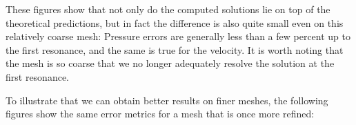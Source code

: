 \documentclass{article}
\begin{document}
These figures show that not only do the computed solutions lie on top
of the theoretical predictions, but in fact the difference is also
quite small even on this relatively coarse mesh: Pressure errors are
generally less than a few percent up to the first resonance, and the
same is true for the velocity. It is worth noting that the mesh is so
coarse that we no longer adequately resolve the solution at the first
resonance.

To illustrate that we can obtain better results on finer meshes, the
following figures show the same error metrics for a mesh that is once
more refined:
\end{document}
